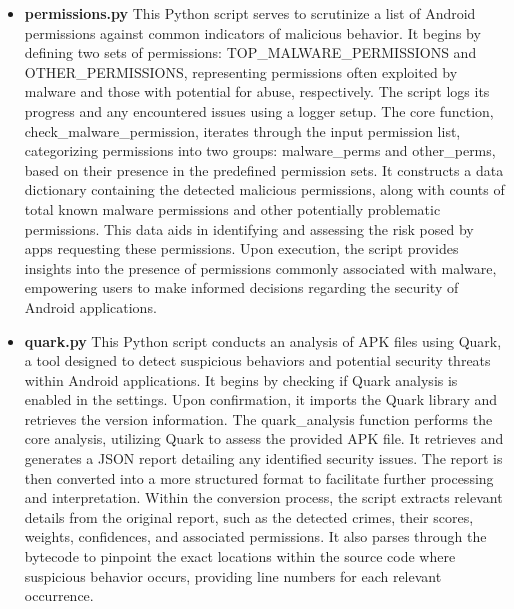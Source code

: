 \documentclass{report}
\begin{document}
\begin{itemize}
    \item \textbf{permissions.py}
    This Python script serves to scrutinize a list of Android permissions against common indicators of malicious behavior. It begins by defining two sets of permissions: \newline TOP\_MALWARE\_PERMISSIONS and OTHER\_PERMISSIONS, representing permissions often exploited by malware and those with potential for abuse, respectively. The script logs its progress and any encountered issues using a logger setup.\newline
    The core function, check\_malware\_permission, iterates through the input permission list, categorizing permissions into two groups: malware\_perms and other\_perms, based on their presence in the predefined permission sets. It constructs a data dictionary containing the detected malicious permissions, along with counts of total known malware permissions and other potentially problematic permissions. This data aids in identifying and assessing the risk posed by apps requesting these permissions.\newline   
    Upon execution, the script provides insights into the presence of permissions commonly associated with malware, empowering users to make informed decisions regarding the security of Android applications.

    \item \textbf{quark.py}
    This Python script conducts an analysis of APK files using Quark, a tool designed to detect suspicious behaviors and potential security threats within Android applications. It begins by checking if Quark analysis is enabled in the settings. Upon confirmation, it imports the Quark library and retrieves the version information.\newline
    The quark\_analysis function performs the core analysis, utilizing Quark to assess the provided APK file. It retrieves and generates a JSON report detailing any identified security issues. The report is then converted into a more structured format to facilitate further processing and interpretation.\newline   
    Within the conversion process, the script extracts relevant details from the original report, such as the detected crimes, their scores, weights, confidences, and associated permissions. It also parses through the bytecode to pinpoint the exact locations within the source code where suspicious behavior occurs, providing line numbers for each relevant occurrence.

\end{itemize}
\end{document}
